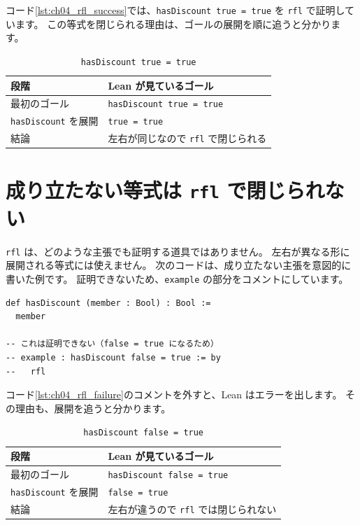 コード\ref{lst:ch04_rfl_success}では、\texttt{hasDiscount true = true} を \texttt{rfl} で証明しています。
この等式を閉じられる理由は、ゴールの展開を順に追うと分かります。

\begin{table}[htbp]
\centering
\caption{\texttt{hasDiscount true = true}}
\label{tab:ch04-success}
\begin{tabular}{ll}
\toprule
段階 & Lean が見ているゴール \\
\midrule
最初のゴール & \texttt{hasDiscount true = true} \\
\texttt{hasDiscount} を展開 & \texttt{true = true} \\
結論 & 左右が同じなので \texttt{rfl} で閉じられる \\
\bottomrule
\end{tabular}
\end{table}

\section{成り立たない等式は \texttt{rfl} で閉じられない}

\texttt{rfl} は、どのような主張でも証明する道具ではありません。
左右が異なる形に展開される等式には使えません。
次のコードは、成り立たない主張を意図的に書いた例です。
証明できないため、\texttt{example} の部分をコメントにしています。

\begin{listing}[htbp]
\begin{verbatim}
def hasDiscount (member : Bool) : Bool :=
  member

-- これは証明できない（false = true になるため）
-- example : hasDiscount false = true := by
--   rfl
\end{verbatim}
\caption{\texttt{hasDiscount false = true}}
\label{lst:ch04_rfl_failure}
\end{listing}

コード\ref{lst:ch04_rfl_failure}のコメントを外すと、Lean はエラーを出します。
その理由も、展開を追うと分かります。

\begin{table}[htbp]
\centering
\caption{\texttt{hasDiscount false = true}}
\label{tab:ch04-failure}
\begin{tabular}{ll}
\toprule
段階 & Lean が見ているゴール \\
\midrule
最初のゴール & \texttt{hasDiscount false = true} \\
\texttt{hasDiscount} を展開 & \texttt{false = true} \\
結論 & 左右が違うので \texttt{rfl} では閉じられない \\
\bottomrule
\end{tabular}
\end{table}

